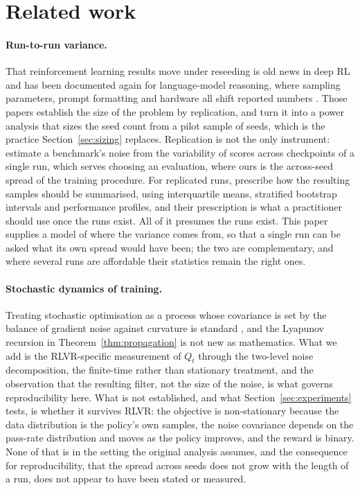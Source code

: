 \section{Related work}
\label{sec:related}

\paragraph{Run-to-run variance.} That reinforcement learning results move under reseeding is old
news in deep RL \citep{henderson2018matters} and has been documented again for language-model
reasoning, where sampling parameters, prompt formatting and hardware all shift reported numbers
\citep{hochlehnert2025sober}. Those papers establish the size of the problem by replication, and
\citet{colas2018seeds} turn it into a power analysis that sizes the seed count from a pilot
sample of seeds, which is the practice Section~\ref{sec:sizing} replaces. Replication is not the
only instrument: \citet{heineman2025signal} estimate a benchmark's noise from the variability of
scores across checkpoints of a single run, which serves choosing an evaluation, where ours is the
across-seed spread of the training procedure. For replicated runs, \citet{agarwal2021precipice} prescribe how the resulting samples should be
summarised, using interquartile means, stratified bootstrap intervals and performance profiles, and
their prescription is what a practitioner should use once the runs exist. All of it presumes the
runs exist. This paper supplies a model of where the variance comes from, so that a single run can
be asked what its own spread would have been; the two are complementary, and where several runs are
affordable their statistics remain the right ones.

\paragraph{Stochastic dynamics of training.} Treating stochastic optimisation as a process
whose covariance is set by the balance of gradient noise against curvature is standard
\citep{mandt2017sgd}, and the Lyapunov recursion in Theorem~\ref{thm:propagation} is not new
as mathematics. What we add is the RLVR-specific measurement of $Q_t$ through the two-level
noise decomposition, the finite-time rather than stationary treatment, and the observation
that the resulting filter, not the size of the noise, is what governs reproducibility here. What is not established, and what
Section~\ref{sec:experiments} tests, is whether it survives RLVR: the objective is non-stationary
because the data distribution is the policy's own samples, the noise covariance depends on the
pass-rate distribution and moves as the policy improves, and the reward is binary. None of that is
in the setting the original analysis assumes, and the consequence for reproducibility, that the
spread across seeds does not grow with the length of a run, does not appear to have been stated
or measured.

